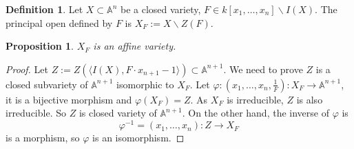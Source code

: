 \documentclass{amsart}
\theoremstyle{plain}
\newtheorem{proposition}{Proposition}
\theoremstyle{definition}
\newtheorem{definition}{Definition}
\theoremstyle{remark}
\numberwithin{equation}{section}
\begin{document}
\begin{definition}
	Let $ X\subset \mathbb{A}^n $ be a closed variety, $ F\in k[x_1,\dots,x_n]\backslash I(X) $. The principal open defined by $ F $ is $ X_F:=X\backslash Z(F) $.
\end{definition}
\begin{proposition}\label{14}
	$ X_F $ is an affine variety.
\end{proposition}
\begin{proof}
	Let $ Z:=Z(\langle I(X),F\cdot x_{n+1}-1\rangle )\subset \mathbb{A}^{n+1} $. We need to prove $ Z $ is a closed subvariety of $ \mathbb{A}^{n+1} $ isomorphic to $ X_F $. Let $ \varphi:(x_1,\dots,x_n,\frac{1}{F}):X_F\to \mathbb{A}^{n+1} $, it is a bijective morphism and $ \varphi(X_F)=Z $. As $ X_F $ is irreducible, $ Z $ is also irreducible. So $ Z $ is closed variety of $ \mathbb{A}^{n+1} $. On the other hand, the inverse of $ \varphi $ is 
	$$
	\varphi^{-1}=(x_1,\dots,x_n):Z\to X_F
	$$
	is a morphism, so $ \varphi $ is an isomorphism. 
\end{proof}
\end{document}

